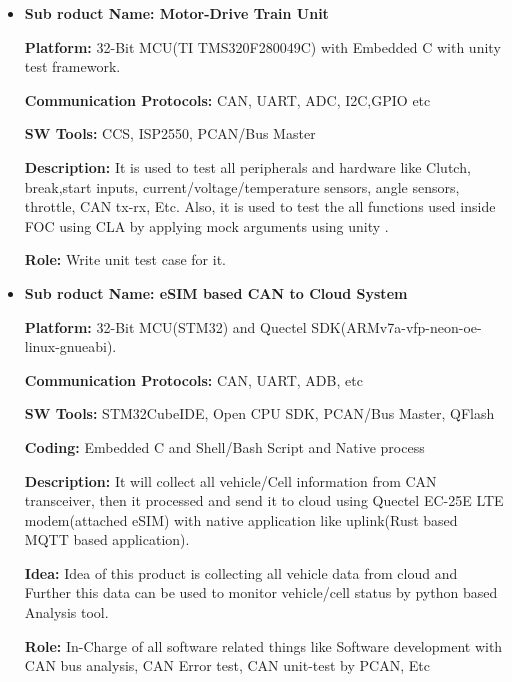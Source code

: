 \begin{itemize}
    \item{\textbf{Sub {\faProductHunt}roduct Name: {Motor-Drive Train Unit}}}\par
    \textbf{Platform:} 32-Bit MCU(TI TMS320F280049C) with Embedded C with unity test framework.\par
    \textbf{Communication Protocols:} CAN, UART, ADC, I2C,GPIO etc\par
    \textbf{SW Tools:} CCS, ISP2550, PCAN/Bus Master\par
    \textbf{Description:} It is used to test all peripherals and hardware like Clutch, break,start inputs, current/voltage/temperature sensors, angle sensors, throttle, CAN tx-rx, Etc. Also, it is used to test the all functions used inside FOC using CLA by applying mock arguments using unity .\par
    \textbf{Role:} Write unit test case for it.\par
    
    \item{\textbf{Sub {\faProductHunt}roduct Name: {eSIM based CAN to Cloud System}}}\par
    \textbf{Platform:} 32-Bit MCU(STM32) and Quectel SDK(ARMv7a-vfp-neon-oe-linux-gnueabi).\par
    \textbf{Communication Protocols:} CAN, UART, ADB, etc\par
    \textbf{SW Tools:} STM32CubeIDE, Open CPU SDK, PCAN/Bus Master, QFlash\par
    \textbf{Coding:} Embedded C and Shell/Bash Script and Native process\par
    \textbf{Description:} It will collect all vehicle/Cell information from  CAN transceiver, then it processed and send it to cloud using Quectel EC-25E LTE modem(attached eSIM) with native application like uplink(Rust based MQTT based application).\par
    \textbf{Idea:} Idea of this product is collecting all vehicle data from cloud and Further this data can be used to monitor vehicle/cell status by python based Analysis tool.\par
    \textbf{Role:} In-Charge of all software related things like Software development with CAN bus analysis, CAN Error test, CAN unit-test by PCAN, Etc\par
\par


\end{itemize}
